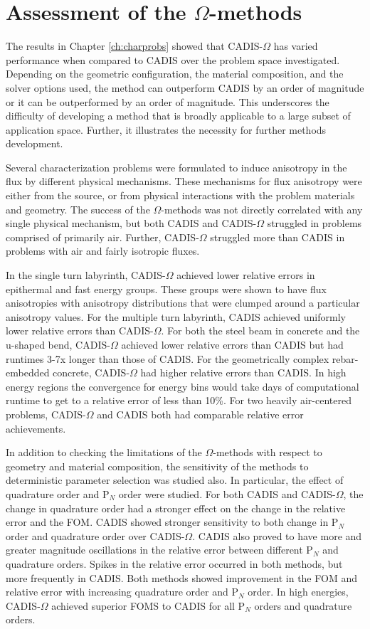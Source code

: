\section{Assessment of the $\Omega$-methods}
\label{sec:assessments}

The results in Chapter \ref{ch:charprobs} showed that CADIS-$\Omega$ has varied
performance when compared to CADIS over the problem space investigated.
Depending on the geometric configuration, the material composition, and the
solver options used, the method can outperform CADIS by an order of magnitude or
it can be outperformed by an order of magnitude. This underscores the difficulty
of developing a method that is broadly applicable to a large subset of
application space. Further, it illustrates the necessity for further methods
development.

Several characterization problems were formulated to induce anisotropy in the
flux by different physical mechanisms. These mechanisms for flux anisotropy were
either from the source, or from physical interactions with the problem materials
and geometry. The success of the $\Omega$-methods was not directly correlated
with any single physical mechanism, but both CADIS and CADIS-$\Omega$ struggled
in problems comprised of primarily air. Further, CADIS-$\Omega$ struggled more
than CADIS in problems with air and fairly isotropic fluxes.

In the single turn labyrinth, CADIS-$\Omega$ achieved lower relative errors in
epithermal and fast energy groups. These groups were shown to have flux
anisotropies with anisotropy distributions that were clumped around a particular
anisotropy values.
For the multiple turn labyrinth, CADIS achieved uniformly lower relative errors
than CADIS-$\Omega$. For both the steel beam in concrete and the u-shaped bend,
CADIS-$\Omega$ achieved lower relative errors than CADIS but had runtimes 3-7x
longer than those of CADIS. For the geometrically complex rebar-embedded
concrete, CADIS-$\Omega$ had higher relative errors than CADIS. In high energy
regions the convergence for energy bins would take days of computational runtime
to get to a relative error of less than 10\%. For two heavily air-centered
problems, CADIS-$\Omega$ and CADIS both had comparable relative error
achievements.

In addition to checking the limitations of the $\Omega$-methods with respect to
geometry and material composition, the sensitivity of the methods to
deterministic parameter selection was studied also. In particular, the effect of
quadrature order and P$_N$ order were studied. For both CADIS and
CADIS-$\Omega$, the change in quadrature order had a stronger effect on the
change in the relative error and the FOM. CADIS showed stronger sensitivity to
both change in P$_N$ order and quadrature order over CADIS-$\Omega$. CADIS also
proved to have more and greater magnitude oscillations in the relative error
between different P$_N$ and quadrature orders. Spikes in the relative error
occurred in both methods, but more frequently in CADIS. Both
methods showed improvement in the FOM and relative error with increasing
quadrature order and P$_N$ order.
In high energies, CADIS-$\Omega$ achieved superior FOMS to CADIS for all P$_N$
orders and quadrature orders.

